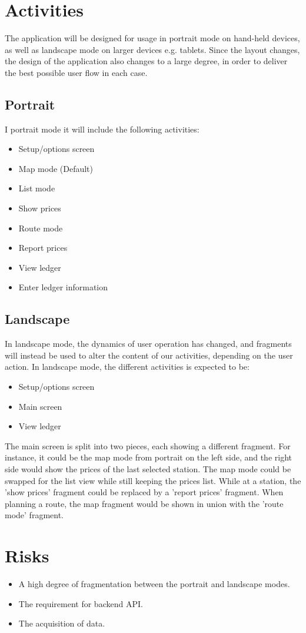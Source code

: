 \section{Activities}
The application will be designed for usage in portrait mode on hand-held devices, as well as landscape mode on larger devices e.g. tablets. Since the layout changes, the design of the application also changes to a large degree, in order to deliver the best possible user flow in each case.

\subsection{Portrait}
I portrait mode it will include the following activities:
\begin{itemize}
	\item Setup/options screen
	\item Map mode (Default)
	\item List mode
	\item Show prices
	\item Route mode
	\item Report prices
	\item View ledger
	\item Enter ledger information
\end{itemize}

\subsection{Landscape}
In landscape mode, the dynamics of user operation has changed, and fragments will instead be used to alter the content of our activities, depending on the user action. In landscape mode, the different activities is expected to be:
\begin{itemize}
	\item Setup/options screen
	\item Main screen
	\item View ledger
\end{itemize}

The main screen is split into two pieces, each showing a different fragment. For instance, it could be the map mode from portrait on the left side, and the right side would show the prices of the last selected station. The map mode could be swapped for the list view while still keeping the prices list. While at a station, the 'show prices' fragment could be replaced by a 'report prices' fragment. When planning a route, the map fragment would be shown in union with the 'route mode' fragment.

\section{Risks}
\begin{itemize}
	\item A high degree of fragmentation between the portrait and landscape modes.
	\item The requirement for backend API.
	\item The acquisition of data.
\end{itemize}
